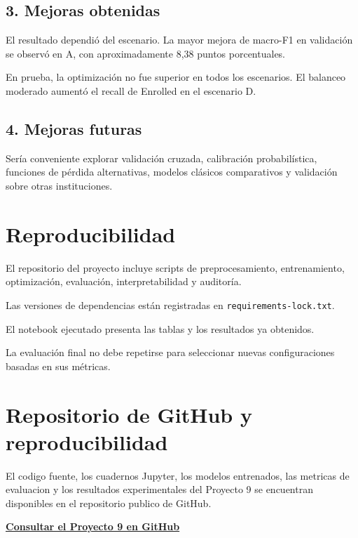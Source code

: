 \documentclass[11pt,a4paper]{article}
\begin{document}
\subsection*{3. Mejoras obtenidas}

El resultado dependió del escenario.
La mayor mejora de macro-F1 en validación
se observó en A, con aproximadamente
8,38 puntos porcentuales.

En prueba, la optimización no fue superior
en todos los escenarios.
El balanceo moderado aumentó el recall de
Enrolled en el escenario D.

\subsection*{4. Mejoras futuras}

Sería conveniente explorar validación cruzada,
calibración probabilística, funciones de pérdida
alternativas, modelos clásicos comparativos
y validación sobre otras instituciones.

\section{Reproducibilidad}

El repositorio del proyecto incluye scripts de
preprocesamiento, entrenamiento, optimización,
evaluación, interpretabilidad y auditoría.

Las versiones de dependencias están registradas
en \texttt{requirements-lock.txt}.

El notebook ejecutado presenta las tablas
y los resultados ya obtenidos.

La evaluación final no debe repetirse
para seleccionar nuevas configuraciones
basadas en sus métricas.

\section*{Repositorio de GitHub y reproducibilidad}
El codigo fuente, los cuadernos Jupyter, los modelos
entrenados, las metricas de evaluacion y los resultados
experimentales del Proyecto 9 se encuentran disponibles
en el repositorio publico de GitHub.

\begin{center}
    \href{
    https://github.com/alexroma1126-design/proyecto9-keras-optuna-desercion-academica
    }{\textbf{Consultar el Proyecto 9 en GitHub}}
\end{center}
\end{document}

